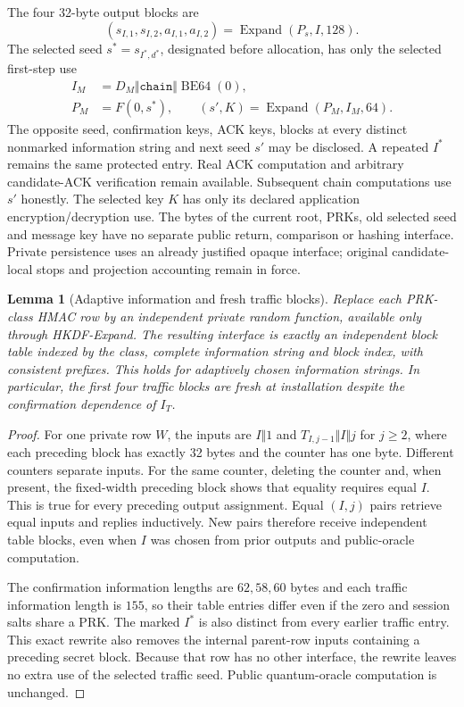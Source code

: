 \documentclass[pdflatex]{sn-jnl}
\theoremstyle{thmstyleone}
\newtheorem{lemma}[theorem]{Lemma}
\theoremstyle{thmstylethree}
\theoremstyle{thmstyletwo}
\begin{document}
The four 32-byte output blocks are
\[
 (s_{I,1},s_{I,2},a_{I,1},a_{I,2})
 =\operatorname{Expand}(P_s,I,128).
\]
The selected seed $s^*=s_{I^*,d^*}$, designated before allocation,
has only the selected first-step use
\begin{equation}
 \begin{split}
 I_M&=D_M\Vert\texttt{chain}\Vert\operatorname{BE64}(0),\\
 P_M&=F(0,s^*),\qquad
 (s',K)=\operatorname{Expand}(P_M,I_M,64).
 \end{split}
 \label{eq:joint-chain-step}
\end{equation}
The opposite seed, confirmation keys, ACK keys, blocks at every distinct
nonmarked information string and next seed $s'$ may be disclosed.
A repeated $I^*$ remains the same protected entry.
Real ACK computation and arbitrary candidate-ACK verification
remain available. Subsequent chain computations use $s'$ honestly.
The selected key $K$ has only its declared application encryption/decryption
use. The bytes of the current root, PRKs, old selected seed and message key
have no separate public return, comparison or hashing interface. Private persistence
uses an already justified opaque interface; original candidate-local stops
and projection accounting remain in force.

\begin{lemma}[Adaptive information and fresh traffic blocks]
\label{lem:joint-expand-blocks}
Replace each PRK-class HMAC row by an independent private random function,
available only through HKDF-Expand. The resulting interface is exactly an
independent block table indexed by the class, complete information string
and block index, with consistent prefixes. This holds for adaptively
chosen information strings. In particular, the first four traffic blocks
are fresh at installation despite the confirmation dependence of $I_T$.
\end{lemma}
\begin{proof}
For one private row $W$, the inputs are
$I\Vert1$ and $T_{I,j-1}\Vert I\Vert j$ for $j\ge2$, where each preceding
block has exactly 32 bytes and the counter has one byte. Different counters
separate inputs. For the same counter, deleting the counter and, when
present, the fixed-width preceding block shows that equality requires equal
$I$. This is true for every preceding output assignment. Equal $(I,j)$
pairs retrieve equal inputs and replies inductively. New pairs therefore
receive independent table blocks, even when $I$ was chosen from prior
outputs and public-oracle computation.

The confirmation information lengths are $62,58,60$ bytes and each traffic
information length is $155$, so their table entries differ even if the
zero and session salts share a PRK. The marked $I^*$ is also distinct from
every earlier traffic entry. This exact rewrite also removes
the internal parent-row inputs containing a preceding secret block.
Because that row has no other interface, the rewrite leaves no extra use of the
selected traffic seed. Public quantum-oracle computation is unchanged.
\end{proof}
\end{document}
